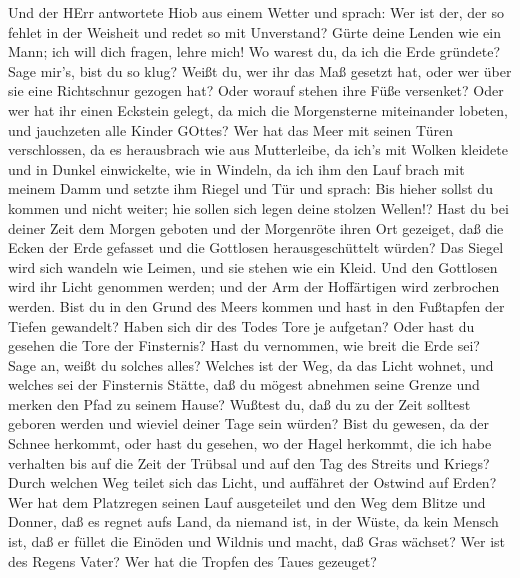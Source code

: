  Und der HErr antwortete Hiob aus einem Wetter und sprach:
 Wer ist der, der so fehlet in der Weisheit und redet so mit
Unverstand?  Gürte deine Lenden wie ein Mann; ich will dich
fragen, lehre mich!  Wo warest du, da ich die Erde gründete?
Sage mir's, bist du so klug?  Weißt du, wer ihr das Maß
gesetzt hat, oder wer über sie eine Richtschnur gezogen hat?
 Oder worauf stehen ihre Füße versenket? Oder wer hat ihr
einen Eckstein gelegt,  da mich die Morgensterne miteinander
lobeten, und jauchzeten alle Kinder GOttes?  Wer hat das
Meer mit seinen Türen verschlossen, da es herausbrach wie aus
Mutterleibe,  da ich's mit Wolken kleidete und in Dunkel
einwickelte, wie in Windeln,  da ich ihm den Lauf brach mit
meinem Damm und setzte ihm Riegel und Tür  und sprach: Bis
hieher sollst du kommen und nicht weiter; hie sollen sich legen deine
stolzen Wellen!?  Hast du bei deiner Zeit dem Morgen
geboten und der Morgenröte ihren Ort gezeiget,  daß die
Ecken der Erde gefasset und die Gottlosen herausgeschüttelt würden?
 Das Siegel wird sich wandeln wie Leimen, und sie stehen
wie ein Kleid.  Und den Gottlosen wird ihr Licht genommen
werden; und der Arm der Hoffärtigen wird zerbrochen werden.
 Bist du in den Grund des Meers kommen und hast in den
Fußtapfen der Tiefen gewandelt?  Haben sich dir des Todes
Tore je aufgetan? Oder hast du gesehen die Tore der Finsternis?
 Hast du vernommen, wie breit die Erde sei? Sage an, weißt
du solches alles?  Welches ist der Weg, da das Licht
wohnet, und welches sei der Finsternis Stätte,  daß du
mögest abnehmen seine Grenze und merken den Pfad zu seinem Hause?
 Wußtest du, daß du zu der Zeit solltest geboren werden und
wieviel deiner Tage sein würden?  Bist du gewesen, da der
Schnee herkommt, oder hast du gesehen, wo der Hagel herkommt,
 die ich habe verhalten bis auf die Zeit der Trübsal und
auf den Tag des Streits und Kriegs?  Durch welchen Weg
teilet sich das Licht, und auffähret der Ostwind auf Erden?
 Wer hat dem Platzregen seinen Lauf ausgeteilet und den Weg
dem Blitze und Donner,  daß es regnet aufs Land, da niemand
ist, in der Wüste, da kein Mensch ist,  daß er füllet die
Einöden und Wildnis und macht, daß Gras wächset?  Wer ist
des Regens Vater? Wer hat die Tropfen des Taues gezeuget? 
